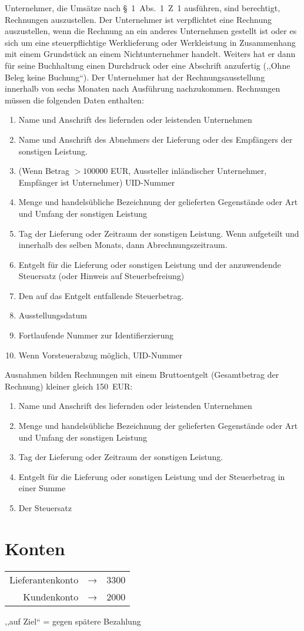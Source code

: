 \documentclass[11pt]{article}
\begin{document}
Unternehmer, die Umsätze nach §~1~Abs.~1~Z~1 ausführen, sind berechtigt, Rechnungen auszustellen. Der Unternehmer ist verpflichtet eine Rechnung auszustellen, wenn die Rechnung an ein anderes Unternehmen gestellt ist oder es sich um eine steuerpflichtige Werklieferung oder Werkleistung in Zusammenhang mit einem Grundstück an einem Nichtunternehmer handelt. Weiters hat er dann für seine Buchhaltung einen Durchdruck oder eine Abschrift anzufertig (,,Ohne Beleg keine Buchung``). Der Unternehmer hat der Rechnungsausstellung innerhalb von sechs Monaten nach Ausführung nachzukommen. Rechnungen müssen die folgenden Daten enthalten:
%
\begin{enumerate}
  \item Name und Anschrift des liefernden oder leistenden Unternehmen
  \item Name und Anschrift des Abnehmers der Lieferung oder des Empfängers der sonstigen Leistung.
  \item (Wenn Betrag $> 100000$ EUR, Aussteller inländischer Unternehmer, Empfänger ist Unternehmer) UID-Nummer
  \item Menge und handelsübliche Bezeichnung der gelieferten Gegenstände oder Art und Umfang der sonstigen Leistung
  \item Tag der Lieferung oder Zeitraum der sonstigen Leistung. Wenn aufgeteilt und innerhalb des selben Monats, dann Abrechnungszeitraum.
  \item Entgelt für die Lieferung oder sonstigen Leistung und der anzuwendende Steuersatz (oder Hinweis auf Steuerbefreiung)
  \item Den auf das Entgelt entfallende Steuerbetrag.
  \item Ausstellungsdatum
  \item Fortlaufende Nummer zur Identifierzierung
  \item Wenn Vorsteuerabzug möglich, UID-Nummer
\end{enumerate}
%
Ausnahmen bilden Rechnungen mit einem Bruttoentgelt (Gesamtbetrag der Rechnung) kleiner gleich 150~EUR:
%
\begin{enumerate}
  \item Name und Anschrift des liefernden oder leistenden Unternehmen
  \item Menge und handelsübliche Bezeichnung der gelieferten Gegenstände oder Art und Umfang der sonstigen Leistung
  \item Tag der Lieferung oder Zeitraum der sonstigen Leistung.
  \item Entgelt für die Lieferung oder sonstigen Leistung und der Steuerbetrag in einer Summe
  \item Der Steuersatz
\end{enumerate}
%
\section{Konten}
%
\begin{table}[th]
  \begin{tabular}{rcl}
    Lieferantenkonto & → & 3300 \\
    Kundenkonto & → & 2000
  \end{tabular}
\end{table}

,,auf Ziel`` = gegen spätere Bezahlung

\end{document}
